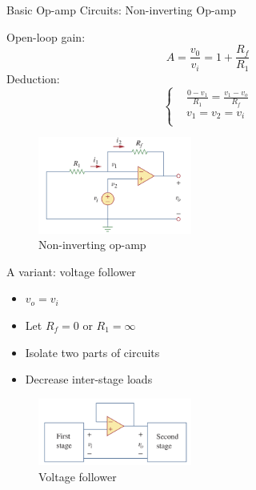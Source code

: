 \documentclass{beamer}
\begin{document}
\begin{frame}{Basic Op-amp Circuits: Non-inverting Op-amp}

\begin{multicols}{2}
    \sectiont{}
    Open-loop gain:
    $$A = \frac{v_0}{v_i} = 1 + \frac{R_f}{R_1}$$
    Deduction:
    $$\left\{\begin{aligned}
        &\frac{0 - v_1}{R_1} = \frac{v_1-v_o}{R_f}\\
        &v_1=v_2=v_i\\
    \end{aligned}\right.
    $$
    
    \sectiont{}
    \begin{figure}[H]
        \centering
        \includegraphics[width=0.45\textwidth]{img_opamp/6_non-inverting.png}
        \caption{Non-inverting op-amp}
    \end{figure}
\end{multicols}

\begin{multicols}{2}
    \sectiont{}
    A variant: voltage follower
    \begin{itemize}
        \item $v_o=v_i$
        \item Let $R_f=0$ or $R_1 = \infty$
        \item Isolate two parts of circuits
        \item Decrease inter-stage loads
    \end{itemize}
    
    \sectiont{}
    \begin{figure}[H]
        \centering
        \includegraphics[width=0.45\textwidth]{img_opamp/7_voltage follower.png}
        \caption{Voltage follower}
    \end{figure}
    
\end{multicols}

\end{frame}
\end{document}
